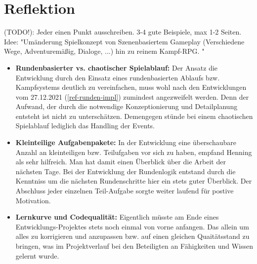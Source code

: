 
\section{Reflektion}

(TODO!): Jeder einen Punkt ausschreiben. 3-4 gute Beispiele, max 1-2 Seiten. Idee: "Umänderung Spielkonzept von Szenenbasiertem Gameplay (Verschiedene Wege, Adventuremäßig, Dialoge, ...) hin zu reinem Kampf-RPG. "

\begin{itemize}

    \item \textbf{Rundenbasierter vs. chaotischer Spielablauf:} Der Ansatz die Entwicklung durch den Einsatz eines rundenbasierten Ablaufs bzw. Kampfsystems deutlich zu vereinfachen, muss wohl nach den Entwicklungen vom 27.12.2021 (\ref{ref-runden-impl}) zumindest angezweifelt werden. Denn der Aufwand, der durch die notwendige Konzeptionierung und Detailplanung entsteht ist nicht zu unterschätzen. Demengegen stünde bei einem chaotischen Spielablauf lediglich das Handling der Events. 

    \item \textbf{Kleinteilige Aufgabenpakete:} In der Entwicklung eine überschaubare Anzahl an kleinteiligen bzw. Teilufgaben vor sich zu haben, empfand Henning als sehr hilfreich. Man hat damit einen Überblick über die Arbeit der nächsten Tage. Bei der Entwicklung der Rundenlogik entstand durch die Kenntniss um die nächsten Rundenschritte hier ein stets guter Überblick. Der Abschluss jeder einzelnen Teil-Aufgabe sorgte weiter laufend für postive Motivation.

    \item \textbf{Lernkurve und Codequalität:} Eigentlich müsste am Ende eines Entwicklungs-Projektes stets noch einmal von vorne anfangen. Das allein um alles zu korrigieren und anzupassen bzw. auf einen gleichen Quaitätsstand zu bringen, was im Projektverlauf bei den Beteiligten an Fähigkeiten und Wissen gelernt wurde.
    

\end{itemize}

